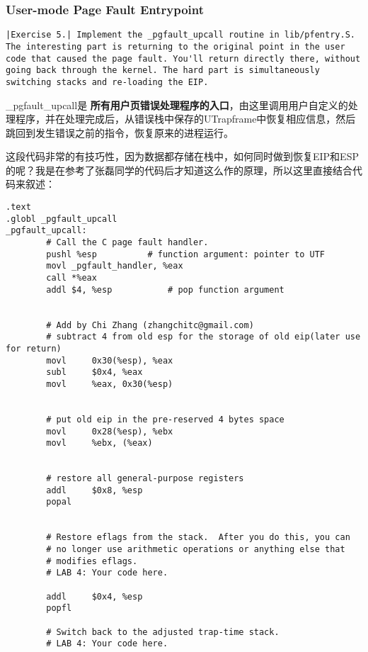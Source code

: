 \documentclass{article}
\newcommand{\highlight}[1]{{\bfseries \color{red}  #1}}
\begin{document}
\begin{CJK*}{UTF8}{gkai}
\subsubsection{User-mode Page Fault Entrypoint}

\begin{lstlisting}[style=exercise]
|Exercise 5.| Implement the _pgfault_upcall routine in lib/pfentry.S. The interesting part is returning to the original point in the user code that caused the page fault. You'll return directly there, without going back through the kernel. The hard part is simultaneously switching stacks and re-loading the EIP.
\end{lstlisting}

\_pgfault\_upcall是\highlight{所有用户页错误处理程序的入口}，由这里调用用户自定义的处理程序，并在处理完成后，从错误栈中保存的UTrapframe中恢复相应信息，然后跳回到发生错误之前的指令，恢复原来的进程运行。

这段代码非常的有技巧性，因为数据都存储在栈中，如何同时做到恢复EIP和ESP的呢？我是在参考了张磊同学的代码后才知道这么作的原理，所以这里直接结合代码来叙述：

\begin{lstlisting}[style=acode, title={\scriptsize \ttfamily \bfseries lib/pfentry.S}]
.text
.globl _pgfault_upcall
_pgfault_upcall:
        # Call the C page fault handler.
        pushl %esp			# function argument: pointer to UTF
        movl _pgfault_handler, %eax
        call *%eax
        addl $4, %esp			# pop function argument
	

        # Add by Chi Zhang (zhangchitc@gmail.com)
        # subtract 4 from old esp for the storage of old eip(later use for return)
        movl     0x30(%esp), %eax
        subl     $0x4, %eax
        movl     %eax, 0x30(%esp)


        # put old eip in the pre-reserved 4 bytes space
        movl     0x28(%esp), %ebx
        movl     %ebx, (%eax)

    
        # restore all general-purpose registers
        addl     $0x8, %esp
        popal


        # Restore eflags from the stack.  After you do this, you can
        # no longer use arithmetic operations or anything else that
        # modifies eflags.
        # LAB 4: Your code here.

        addl     $0x4, %esp
        popfl

        # Switch back to the adjusted trap-time stack.
        # LAB 4: Your code here.


\end{lstlisting}
\end{CJK*}
\end{document}
